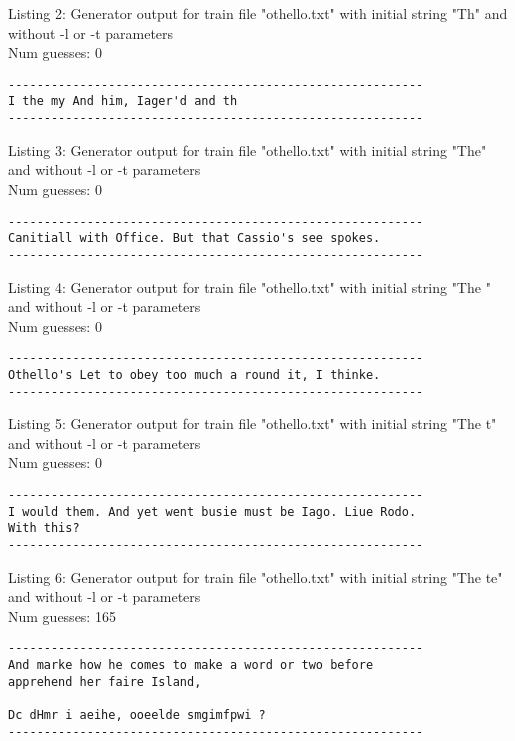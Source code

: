 \documentclass{article}
\begin{document}
Listing 2: Generator output for train file "othello.txt" with initial string "Th" and without -l or -t parameters
\\Num guesses: 0

\begin{lstlisting}
----------------------------------------------------------
I the my And him, Iager'd and th
----------------------------------------------------------
\end{lstlisting}

Listing 3: Generator output for train file "othello.txt" with initial string "The" and without -l or -t parameters
\\Num guesses: 0

\begin{lstlisting}
----------------------------------------------------------
Canitiall with Office. But that Cassio's see spokes.
----------------------------------------------------------
\end{lstlisting}

Listing 4: Generator output for train file "othello.txt" with initial string "The " and without -l or -t parameters
\\Num guesses: 0

\begin{lstlisting}
----------------------------------------------------------
Othello's Let to obey too much a round it, I thinke.
----------------------------------------------------------
\end{lstlisting}

Listing 5: Generator output for train file "othello.txt" with initial string "The t" and without -l or -t parameters
\\Num guesses: 0

\begin{lstlisting}
----------------------------------------------------------
I would them. And yet went busie must be Iago. Liue Rodo. 
With this?
----------------------------------------------------------
\end{lstlisting}

Listing 6: Generator output for train file "othello.txt" with initial string "The te" and without -l or -t parameters
\\Num guesses: 165

\begin{lstlisting}
----------------------------------------------------------
And marke how he comes to make a word or two before 
apprehend her faire Island,

Dc dHmr i aeihe, ooeelde smgimfpwi ? 
----------------------------------------------------------
\end{lstlisting}
\end{document}

